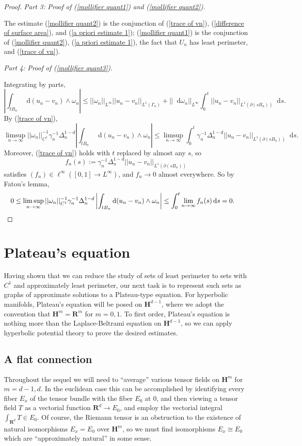 \documentclass[reqno,12pt,letterpaper]{amsart}
\newcommand{\RR}{\mathbf{R}}
\newcommand{\Hyp}{\mathbf H}
\newcommand*\dif{\mathop{}\!\mathrm{d}}
\theoremstyle{definition}
\newcommand{\proofpart}[2]{%
  \par
  \addvspace{\medskipamount}%
  \noindent\emph{Part #1: #2.}
}
\numberwithin{equation}{section}
\begin{document}
\begin{proof}
\proofpart{3}{Proof of (\ref{mollifier quant1}) and (\ref{mollifier quant2})}
The estimate (\ref{mollifier quant2}) is the conjunction of (\ref{trace of vn}), (\ref{difference of surface area}), and (\ref{a priori estimate 1});
(\ref{mollifier quant1}) is the conjunction of (\ref{mollifier quant2}), (\ref{a priori estimate 1}), the fact that $U_n$ has least perimeter, and (\ref{trace of vn}).

\proofpart{4}{Proof of (\ref{mollifier quant3})}
Integrating by parts,
$$\left|\int_{tB_n} \dif (u_n - v_n) \wedge \omega_n\right| \leq ||\omega_n||_{L^\infty} ||u_n - v_n||_{L^1(\Gamma_n)} + ||\dif \omega_n||_{L^\infty} \int_0^t ||u_n - v_n||_{L^1(\partial(sB_n))} \dif s.$$
By (\ref{trace of vn}),
$$\limsup_{n \to \infty} ||\omega_n||_{C^1}^{-1} \gamma_n^{-1} \Delta_n^{1 - d} \left|\int_{tB_n} \dif(u_n - v_n) \wedge \omega_n\right| \leq \limsup_{n \to \infty} \int_0^t \gamma_n^{-1} \Delta_n^{1 - d} ||u_n - v_n||_{L^1(\partial(sB_n))} \dif s.$$
Moreover, (\ref{trace of vn}) holds with $t$ replaced by almost any $s$, so
$$f_n(s) := \gamma_n^{-1} \Delta_n^{1 - d} ||u_n - v_n||_{L^1(\partial(sB_n))}$$
satisfies $(f_n) \in \ell^\infty([0, 1] \to L^\infty)$, and $f_n \to 0$ almost everywhere.
So by Fatou's lemma,
\begin{align*}
0 \leq \limsup_{n \to \infty} ||\omega_n||_{C^1}^{-1} \gamma_n^{-1} \Delta_n^{1 - d} \left|\int_{tB_n} \dif(u_n - v_n) \wedge \omega_n\right| &\leq \int_0^t \lim_{n \to \infty} f_n(s) \dif s = 0. \qedhere
\end{align*}
\end{proof}


\section{Plateau's equation}\label{Plateau section}
Having shown that we can reduce the study of sets of least perimeter to sets with $C^1$ and approximately least perimeter, our next task is to represent such sets as graphs of approximate solutions to a Plateau-type equation.
For hyperbolic manifolds, Plateau's equation will be posed on $\Hyp^{d - 1}$, where we adopt the convention that $\Hyp^m = \RR^m$ for $m = 0, 1$.
To first order, Plateau's equation is nothing more than the Laplace-Beltrami equation on $\Hyp^{d - 1}$, so we can apply hyperbolic potential theory to prove the desired estimates.

\subsection{A flat connection}
Throughout the sequel we will need to ``average'' various tensor fields on $\Hyp^m$ for $m = d-1, d$.
In the euclidean case this can be accomplished by identifying every fiber $E_x$ of the tensor bundle with the fiber $E_0$ at $0$, and then viewing a tensor field $T$ as a vectorial function $\RR^d \to E_0$, and employ the vectorial integral $\int_{\RR^d} T \in E_0$.
Of course, the Riemann tensor is an obstruction to the existence of natural isomorphisms $E_x = E_0$ over $\Hyp^m$, so we must find isomorphisms $E_x \cong E_0$ which are ``approximately natural'' in some sense.
\end{document}
